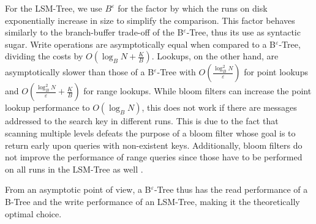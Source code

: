 For the LSM-Tree, we use $B^\varepsilon$ for the factor by which the runs on disk exponentially increase in size to simplify the comparison. This factor behaves similarly to the branch-buffer trade-off of the B$^\varepsilon$-Tree, thus its use as syntactic sugar. Write operations are asymptotically equal when compared to a B$^\varepsilon$-Tree, dividing the costs by $O(\log_B N + \frac{K}{B})$. Lookups, on the other hand, are asymptotically slower than those of a B$^\varepsilon$-Tree with $O(\frac{\log^2_B N}{\varepsilon})$ for point lookups and $O(\frac{\log^2_B N}{\varepsilon} + \frac{K}{B})$ for range lookups. While bloom filters can increase the point lookup performance to $O(\log_B N)$, this does not work if there are messages addressed to the search key in different runs. This is due to the fact that scanning multiple levels defeats the purpose of a bloom filter whose goal is to return early upon queries with non-existent keys. Additionally, bloom filters do not improve the performance of range queries since those have to be performed on all runs in the LSM-Tree as well \cite{massive_datasets}.

From an asymptotic point of view, a B$^\varepsilon$-Tree thus has the read performance of a B-Tree and the write performance of an LSM-Tree, making it the theoretically optimal choice. \cite{b_epsilon_tree}

